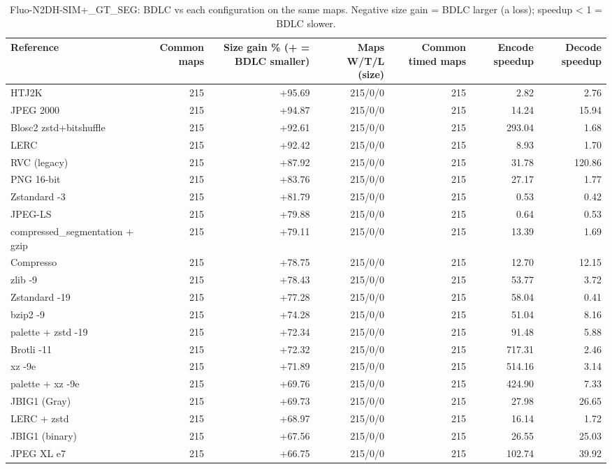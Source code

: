 \begin{table}[t]
\centering
\caption{Fluo-N2DH-SIM+\_GT\_SEG: BDLC vs each configuration on the same maps. Negative size gain = BDLC larger (a loss); speedup < 1 = BDLC slower.}
\begin{tabular}{lrrrrrr}
\hline
Reference & Common maps & Size gain \% (+ = BDLC smaller) & Maps W/T/L (size) & Common timed maps & Encode speedup & Decode speedup \\
\hline
HTJ2K & 215 & +95.69 & 215/0/0 & 215 & 2.82 & 2.76 \\
JPEG 2000 & 215 & +94.87 & 215/0/0 & 215 & 14.24 & 15.94 \\
Blosc2 zstd+bitshuffle & 215 & +92.61 & 215/0/0 & 215 & 293.04 & 1.68 \\
LERC & 215 & +92.42 & 215/0/0 & 215 & 8.93 & 1.70 \\
RVC (legacy) & 215 & +87.92 & 215/0/0 & 215 & 31.78 & 120.86 \\
PNG 16-bit & 215 & +83.76 & 215/0/0 & 215 & 27.17 & 1.77 \\
Zstandard -3 & 215 & +81.79 & 215/0/0 & 215 & 0.53 & 0.42 \\
JPEG-LS & 215 & +79.88 & 215/0/0 & 215 & 0.64 & 0.53 \\
compressed\_segmentation + gzip & 215 & +79.11 & 215/0/0 & 215 & 13.39 & 1.69 \\
Compresso & 215 & +78.75 & 215/0/0 & 215 & 12.70 & 12.15 \\
zlib -9 & 215 & +78.43 & 215/0/0 & 215 & 53.77 & 3.72 \\
Zstandard -19 & 215 & +77.28 & 215/0/0 & 215 & 58.04 & 0.41 \\
bzip2 -9 & 215 & +74.28 & 215/0/0 & 215 & 51.04 & 8.16 \\
palette + zstd -19 & 215 & +72.34 & 215/0/0 & 215 & 91.48 & 5.88 \\
Brotli -11 & 215 & +72.32 & 215/0/0 & 215 & 717.31 & 2.46 \\
xz -9e & 215 & +71.89 & 215/0/0 & 215 & 514.16 & 3.14 \\
palette + xz -9e & 215 & +69.76 & 215/0/0 & 215 & 424.90 & 7.33 \\
JBIG1 (Gray) & 215 & +69.73 & 215/0/0 & 215 & 27.98 & 26.65 \\
LERC + zstd & 215 & +68.97 & 215/0/0 & 215 & 16.14 & 1.72 \\
JBIG1 (binary) & 215 & +67.56 & 215/0/0 & 215 & 26.55 & 25.03 \\
JPEG XL e7 & 215 & +66.75 & 215/0/0 & 215 & 102.74 & 39.92 \\

\end{tabular}
\end{table}
